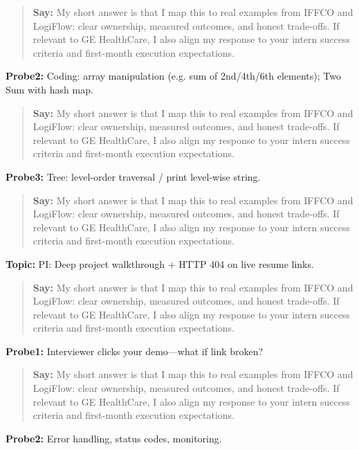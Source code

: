 \documentclass[9pt,a4paper]{article}
\begin{document}
\begin{quote}\small\textbf{Say:} My short answer is that I map this to real examples from IFFCO and LogiFlow: clear ownership, measured outcomes, and honest trade-offs. If relevant to GE HealthCare, I also align my response to your intern success criteria and first-month execution expectations.\end{quote}
\vspace{2mm}
\textbf{Probe2:} Coding: array manipulation (e.g. sum of 2nd/4th/6th elements); Two Sum with hash map.

\begin{quote}\small\textbf{Say:} My short answer is that I map this to real examples from IFFCO and LogiFlow: clear ownership, measured outcomes, and honest trade-offs. If relevant to GE HealthCare, I also align my response to your intern success criteria and first-month execution expectations.\end{quote}
\vspace{2mm}
\textbf{Probe3:} Tree: level-order traversal / print level-wise string.

\begin{quote}\small\textbf{Say:} My short answer is that I map this to real examples from IFFCO and LogiFlow: clear ownership, measured outcomes, and honest trade-offs. If relevant to GE HealthCare, I also align my response to your intern success criteria and first-month execution expectations.\end{quote}
\vspace{2mm}
\textbf{Topic:} PI: Deep project walkthrough + HTTP 404 on live resume links.

\begin{quote}\small\textbf{Say:} My short answer is that I map this to real examples from IFFCO and LogiFlow: clear ownership, measured outcomes, and honest trade-offs. If relevant to GE HealthCare, I also align my response to your intern success criteria and first-month execution expectations.\end{quote}
\vspace{2mm}
\textbf{Probe1:} Interviewer clicks your demo---what if link broken?

\begin{quote}\small\textbf{Say:} My short answer is that I map this to real examples from IFFCO and LogiFlow: clear ownership, measured outcomes, and honest trade-offs. If relevant to GE HealthCare, I also align my response to your intern success criteria and first-month execution expectations.\end{quote}
\vspace{2mm}
\textbf{Probe2:} Error handling, status codes, monitoring.
\end{document}
